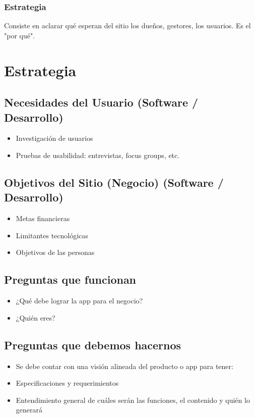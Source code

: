\documentclass{article}
\begin{document}
\subsubsection{Estrategia}
Consiste en aclarar qué esperan del sitio los dueños, gestores, los usuarios. Es el "por qué".

\section{Estrategia}

\subsection{Necesidades del Usuario (Software / Desarrollo)}
\begin{itemize}
    \item Investigación de usuarios
    \item Pruebas de usabilidad: entrevistas, focus groups, etc.
\end{itemize}

\subsection{Objetivos del Sitio (Negocio) (Software / Desarrollo)}
\begin{itemize}
    \item Metas financieras
    \item Limitantes tecnológicas
    \item Objetivos de las personas
\end{itemize}

\subsection{Preguntas que funcionan}
\begin{itemize}
    \item ¿Qué debe lograr la app para el negocio?
    \item ¿Quién eres?
\end{itemize}

\subsection{Preguntas que debemos hacernos}
\begin{itemize}
    \item Se debe contar con una visión alineada del producto o app para tener:
    \item Especificaciones y requerimientos
    \item Entendimiento general de cuáles serán las funciones, el contenido y quién lo generará
\end{itemize}
\end{document}
